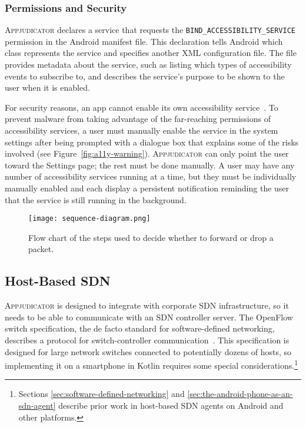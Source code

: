 
\subsubsection{Permissions and Security}
\label{sec:accessibility-permissions}

\textsc{Appjudicator} declares a service that requests the
\texttt{BIND\_ACCESSIBILITY\_SERVICE} permission in the Android manifest file.
This declaration tells Android which class represents the service and specifies
another XML configuration file. The file provides metadata about the service,
such as listing which types of accessibility events to subscribe to, and
describes the service's purpose to be shown to the user when it
is enabled.

For security reasons, an app cannot enable its own accessibility
service~\cite{kalysch2018}. To prevent malware from taking advantage of the
far-reaching permissions of accessibility services, a user must manually enable
the service in the system settings after being prompted with a dialogue box that
explains some of the risks involved (see Figure~\ref{fig:a11y-warning}).
\textsc{Appjudicator} can only point the user toward the Settings page; the rest
must be done manually. A user may have any number of accessibility services
running at a time, but they must be individually manually enabled and each
display a persistent notification reminding the user that the service is still
running in the background.


\begin{figure}[p]
    \centering
    \texttt{[image: sequence-diagram.png]}
    \caption{Flow chart of the steps used to decide whether to forward or drop a
		packet.}
	\label{fig:packet-flow-chart}
\end{figure}


\subsection{Host-Based SDN}
\label{sec:host-based-sdn}

\textsc{Appjudicator} is designed to integrate with corporate SDN
infrastructure, so it needs to be able to communicate with an SDN controller
server. The OpenFlow switch specification, the de facto standard for
software-defined networking, describes a protocol for switch-controller
communication~\cite{openflowspec}. This specification is designed for large
network switches connected to potentially dozens of hosts, so implementing it on
a smartphone in Kotlin requires some special considerations.\footnote{Sections
\ref{sec:software-defined-networking} and 
\ref{sec:the-android-phone-as-an-sdn-agent} describe prior work in host-based
SDN agents on Android and other platforms.}

